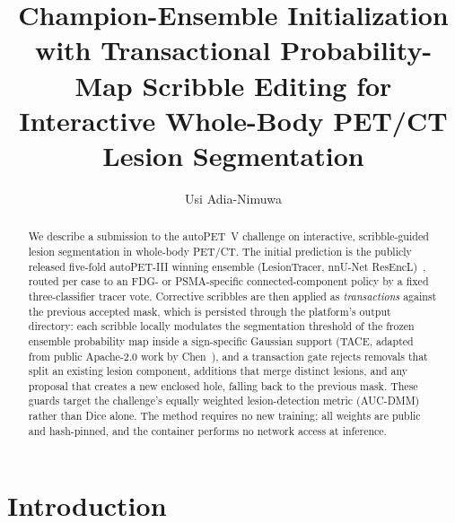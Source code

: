 \documentclass[runningheads]{llncs}
\begin{document}
\title{Champion-Ensemble Initialization with Transactional
Probability-Map Scribble Editing for Interactive Whole-Body PET/CT
Lesion Segmentation}

\author{Usi Adia-Nimuwa}

\maketitle

\begin{abstract}
We describe a submission to the autoPET~V challenge on interactive,
scribble-guided lesion segmentation in whole-body PET/CT. The initial
prediction is the publicly released five-fold autoPET-III winning ensemble
(LesionTracer, nnU-Net ResEncL)~\cite{lesiontracer}, routed per case to an
FDG- or PSMA-specific connected-component policy by a fixed three-classifier
tracer vote. Corrective scribbles are then applied as \emph{transactions}
against the previous accepted mask, which is persisted through the
platform's output directory: each scribble locally modulates the
segmentation threshold of the frozen ensemble probability map inside a
sign-specific Gaussian support (TACE, adapted from public Apache-2.0 work by
Chen~\cite{autopetvrepo}), and a transaction gate rejects removals that
split an existing lesion component, additions that merge distinct lesions,
and any proposal that creates a new enclosed hole, falling back to the
previous mask. These guards target the challenge's equally weighted
lesion-detection metric (AUC-DMM) rather than Dice alone. The method
requires no new training; all weights are public and hash-pinned, and the
container performs no network access at inference.
\end{abstract}

\section{Introduction}
\end{document}
